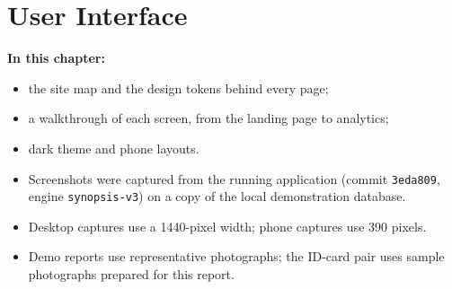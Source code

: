 \documentclass[12pt,a4paper,oneside]{report}
\newcommand{\code}[1]{\texttt{#1}}
\begin{document}
\chapter{User Interface}
\textbf{In this chapter:}
\begin{itemize}[beginpenalty=10000]
  \item the site map and the design tokens behind every page;
  \item a walkthrough of each screen, from the landing page to analytics;
  \item dark theme and phone layouts.
\end{itemize}
\begin{itemize}
  \item Screenshots were captured from the running application (commit \code{3eda809}, engine \code{synopsis-v3}) on a copy of the local demonstration database.
  \item Desktop captures use a 1440-pixel width; phone captures use 390 pixels.
  \item Demo reports use representative photographs; the ID-card pair uses sample photographs prepared for this report.
\end{itemize}
\end{document}

